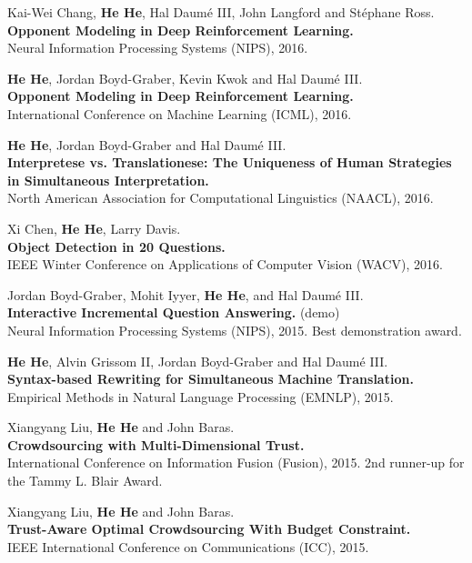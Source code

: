 \documentclass[margin,line]{resume}
\begin{document}
\begin{resume}
Kai-Wei Chang, {\bf He He}, Hal Daum\'e III, John Langford and St\'ephane Ross.\\
{\bf Opponent Modeling in Deep Reinforcement Learning.}\\
Neural Information Processing Systems (NIPS), 2016. 

{\bf He He}, Jordan Boyd-Graber, Kevin Kwok and Hal Daum\'e III.\\
{\bf Opponent Modeling in Deep Reinforcement Learning.}\\
International Conference on Machine Learning (ICML), 2016.

{\bf He He}, Jordan Boyd-Graber and Hal Daum\'e III.\\
{\bf Interpretese vs. Translationese: The Uniqueness of Human Strategies in Simultaneous Interpretation.}\\
North American Association for Computational Linguistics (NAACL), 2016.%

Xi Chen, {\bf He He}, Larry Davis.\\
{\bf Object Detection in 20 Questions.}\\
IEEE Winter Conference on Applications of Computer Vision (WACV), 2016.%

Jordan Boyd-Graber, Mohit Iyyer, {\bf He He}, and Hal Daum\'e III.\\
{\bf Interactive Incremental Question Answering.} (demo)\\
Neural Information Processing Systems (NIPS), 2015. 
Best demonstration award.

{\bf He He}, Alvin Grissom II, Jordan Boyd-Graber and Hal Daum\'e III.\\
{\bf Syntax-based Rewriting for Simultaneous Machine Translation.}\\
Empirical Methods in Natural Language Processing (EMNLP), 2015.%

Xiangyang Liu, {\bf He He} and John Baras.\\
{\bf Crowdsourcing with Multi-Dimensional Trust.}\\
International Conference on Information Fusion (Fusion), 2015.
2nd runner-up for the Tammy L. Blair Award.

Xiangyang Liu, {\bf He He} and John Baras.\\
{\bf Trust-Aware Optimal Crowdsourcing With Budget Constraint.}\\
IEEE International Conference on Communications (ICC), 2015.%


\end{resume}
\end{document}
